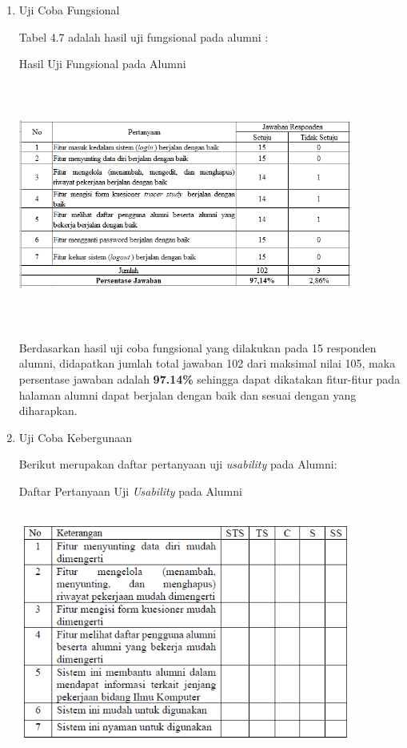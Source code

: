 \begin{enumerate}
	\item Uji Coba Fungsional
	
	Tabel 4.7 adalah hasil uji fungsional pada alumni :
	
	\begin{table}[H]
		\centering
		\caption{Hasil Uji Fungsional pada Alumni}
		\includegraphics[width=11cm,height=8cm]{gambar/UAT/f_alumni}
		\label{f_alumni}
	\end{table}
	
	Berdasarkan hasil uji coba fungsional yang dilakukan pada 15 responden alumni, didapatkan jumlah total jawaban 102 dari maksimal nilai 105, maka persentase jawaban adalah \textbf{97.14\%} sehingga dapat dikatakan fitur-fitur pada halaman alumni dapat berjalan dengan baik dan sesuai dengan yang diharapkan. 
	
	\item Uji Coba Kebergunaan
	
	Berikut merupakan daftar pertanyaan uji \textit{usability} pada Alumni:
	
	\begin{table}[H]
		\centering
		\caption{Daftar Pertanyaan Uji \textit{Usability} pada Alumni}
		\includegraphics[width=11cm,height=8cm]{gambar/UAT/u_alumni}
		\label{u_alumni}
	\end{table}
	

\end{enumerate}
